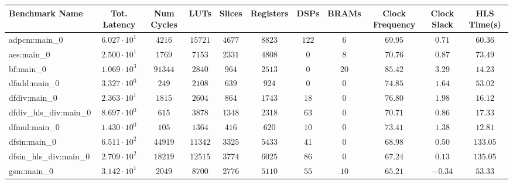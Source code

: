 \begin{tabular}{|l|c|c|c|c|c|c|c|c|c|c|}
\hline
Benchmark Name          & Tot. Latency           & Num Cycles & LUTs       & Slices    & Registers & DSPs    & BRAMs   & Clock Frequency & Clock Slack & HLS Time(s) \\
\hline
adpcm:main\_0           & $ 6.027 \cdot 10^{1} $ & $ 4216   $ & $ 15721  $ & $ 4677  $ & $ 8823  $ & $ 122 $ & $ 6   $ & $ 69.95       $ & $ 0.71    $ & $ 60.36   $ \\
aes:main\_0             & $ 2.500 \cdot 10^{1} $ & $ 1769   $ & $ 7153   $ & $ 2331  $ & $ 4808  $ & $ 0   $ & $ 8   $ & $ 70.76       $ & $ 0.87    $ & $ 73.49   $ \\
bf:main\_0              & $ 1.069 \cdot 10^{3} $ & $ 91344  $ & $ 2840   $ & $ 964   $ & $ 2513  $ & $ 0   $ & $ 20  $ & $ 85.42       $ & $ 3.29    $ & $ 14.23   $ \\
dfadd:main\_0           & $ 3.327 \cdot 10^{0} $ & $ 249    $ & $ 2108   $ & $ 639   $ & $ 924   $ & $ 0   $ & $ 0   $ & $ 74.85       $ & $ 1.64    $ & $ 53.02   $ \\
dfdiv:main\_0           & $ 2.363 \cdot 10^{1} $ & $ 1815   $ & $ 2604   $ & $ 864   $ & $ 1743  $ & $ 18  $ & $ 0   $ & $ 76.80       $ & $ 1.98    $ & $ 16.12   $ \\
dfdiv\_hls\_div:main\_0 & $ 8.697 \cdot 10^{0} $ & $ 615    $ & $ 3878   $ & $ 1348  $ & $ 2318  $ & $ 63  $ & $ 0   $ & $ 70.71       $ & $ 0.86    $ & $ 17.33   $ \\
dfmul:main\_0           & $ 1.430 \cdot 10^{0} $ & $ 105    $ & $ 1364   $ & $ 416   $ & $ 620   $ & $ 10  $ & $ 0   $ & $ 73.41       $ & $ 1.38    $ & $ 12.81   $ \\
dfsin:main\_0           & $ 6.511 \cdot 10^{2} $ & $ 44919  $ & $ 11342  $ & $ 3325  $ & $ 5433  $ & $ 41  $ & $ 0   $ & $ 68.98       $ & $ 0.50    $ & $ 133.05  $ \\
dfsin\_hls\_div:main\_0 & $ 2.709 \cdot 10^{2} $ & $ 18219  $ & $ 12515  $ & $ 3774  $ & $ 6025  $ & $ 86  $ & $ 0   $ & $ 67.24       $ & $ 0.13    $ & $ 135.05  $ \\
gsm:main\_0             & $ 3.142 \cdot 10^{1} $ & $ 2049   $ & $ 8700   $ & $ 2776  $ & $ 5110  $ & $ 55  $ & $ 10  $ & $ 65.21       $ & $ -0.34   $ & $ 53.33   $ \\

\end{tabular}
